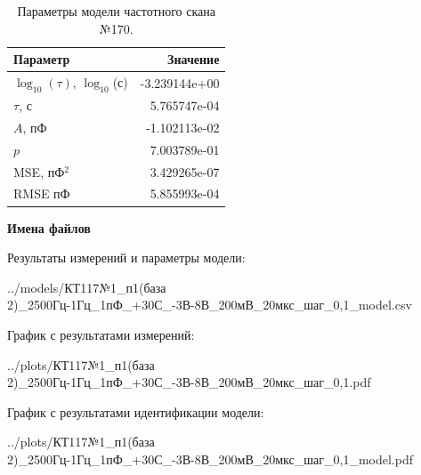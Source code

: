 \begin{table}[!ht]
    \centering
    \caption{Параметры модели частотного скана №170.}
    \begin{tabular}{|l|r|}
        \hline
        Параметр                                       & Значение                  \\ \hline
        $\log_{10}(\tau)$, $\log_{10}$(с)              & -3.239144e+00             \\ \hline
        $\tau$, с                                      & 5.765747e-04              \\ \hline
        $A$, пФ                                        & -1.102113e-02             \\ \hline
        $p$                                            & 7.003789e-01              \\ \hline
        MSE, пФ$^2$                                    & 3.429265e-07              \\ \hline
        RMSE пФ                                        & 5.855993e-04              \\ \hline
    \end{tabular}
    \label{table:frequency_scan_model_170}
\end{table}

\textbf{Имена файлов}

Результаты измерений и параметры модели:

\scriptsize../models/КТ117№1\_п1(база 2)\_2500Гц-1Гц\_1пФ\_+30С\_-3В-8В\_200мВ\_20мкс\_шаг\_0,1\_model.csv
\normalsize

График с результатами измерений:

\scriptsize../plots/КТ117№1\_п1(база 2)\_2500Гц-1Гц\_1пФ\_+30С\_-3В-8В\_200мВ\_20мкс\_шаг\_0,1.pdf
\normalsize

График с результатами идентификации модели:

\scriptsize../plots/КТ117№1\_п1(база 2)\_2500Гц-1Гц\_1пФ\_+30С\_-3В-8В\_200мВ\_20мкс\_шаг\_0,1\_model.pdf
\normalsize

